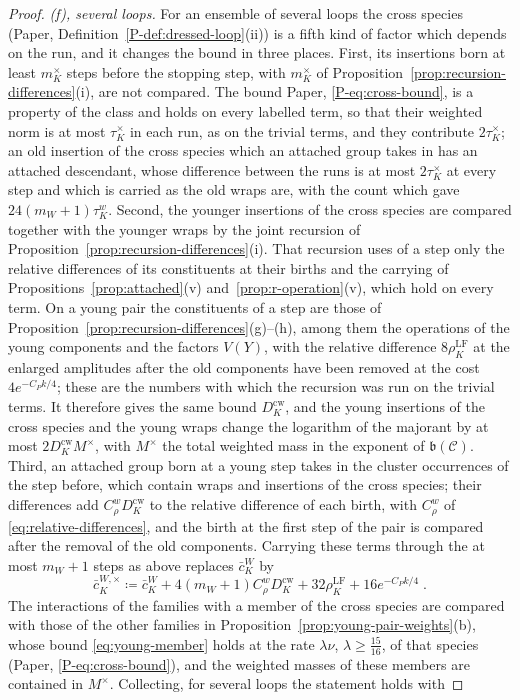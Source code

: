 \documentclass[11pt]{preprint}
\numberwithin{equation}{section}
\theoremstyle{definition}
\theoremstyle{remark}
\theoremstyle{plain}
\begin{document}
\begin{proof}
\emph{(f), several loops.} For an ensemble of several loops the cross species (Paper, Definition~\ref{P-def:dressed-loop}(ii)) is a fifth kind of factor which depends on the run, and it changes the bound in three places. First, its insertions born at least $m^\times_K$ steps before the stopping step, with $m^\times_K$ of Proposition~\ref{prop:recursion-differences}(i), are not compared. The bound Paper, \eqref{P-eq:cross-bound}, is a property of the class and holds on every labelled term, so that their weighted norm is at most $\tau^\times_K$ in each run, as on the trivial terms, and they contribute $2\tau^\times_K$; an old insertion of the cross species which an attached group takes in has an attached descendant, whose difference between the runs is at most $2\tau^\times_K$ at every step and which is carried as the old wraps are, with the count which gave $24(m_W + 1)\tau^w_K$. Second, the younger insertions of the cross species are compared together with the younger wraps by the joint recursion of Proposition~\ref{prop:recursion-differences}(i). That recursion uses of a step only the relative differences of its constituents at their births and the carrying of Propositions~\ref{prop:attached}(v) and~\ref{prop:r-operation}(v), which hold on every term. On a young pair the constituents of a step are those of Proposition~\ref{prop:recursion-differences}(g)--(h), among them the operations of the young components and the factors $V(Y)$, with the relative difference $8\rho^{\mathrm{LF}}_K$ at the enlarged amplitudes after the old components have been removed at the cost $4e^{-C_Pk/4}$; these are the numbers with which the recursion was run on the trivial terms. It therefore gives the same bound $D^{\mathrm{cw}}_K$, and the young insertions of the cross species and the young wraps change the logarithm of the majorant by at most $2D^{\mathrm{cw}}_KM^\times$, with $M^\times$ the total weighted mass in the exponent of $\mathfrak b(\mathcal C)$. Third, an attached group born at a young step takes in the cluster occurrences of the step before, which contain wraps and insertions of the cross species; their differences add $C^w_\rho D^{\mathrm{cw}}_K$ to the relative difference of each birth, with $C^w_\rho$ of \eqref{eq:relative-differences}, and the birth at the first step of the pair is compared after the removal of the old components. Carrying these terms through the at most $m_W + 1$ steps as above replaces $\bar c^W_K$ by
\[
    \bar c^{W,\times}_K \coloneqq \bar c^W_K + 4(m_W + 1)C^w_\rho D^{\mathrm{cw}}_K + 32\rho^{\mathrm{LF}}_K + 16e^{-C_Pk/4}\;.
\]
The interactions of the families with a member of the cross species are compared with those of the other families in Proposition~\ref{prop:young-pair-weights}(b), whose bound \eqref{eq:young-member} holds at the rate $\lambda\nu$, $\lambda \geq \frac{15}{16}$, of that species (Paper, \eqref{P-eq:cross-bound}), and the weighted masses of these members are contained in $M^\times$. Collecting, for several loops the statement holds with

\end{proof}
\end{document}
